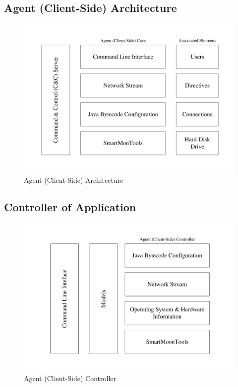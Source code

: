\subsection{Agent (Client-Side) Architecture}

\begin{figure}[h]
    \centering
    \includegraphics[width=1.0\textwidth]{images/agent-architecture.pdf}
    \captionsetup{justification=centering}
    \caption[Agent (Client-Side) Architecture]{Agent (Client-Side) Architecture}
    \label{fig:agent-architecture}
\end{figure}

\newpage

\subsection{Controller of Application}

\begin{figure}[h]
    \centering
    \includegraphics[width=1.0\textwidth]{images/agent-controller.pdf}
    \captionsetup{justification=centering}
    \caption[Agent (Client-Side) Controller]{Agent (Client-Side) Controller}
    \label{fig:agent-controller}
\end{figure}

